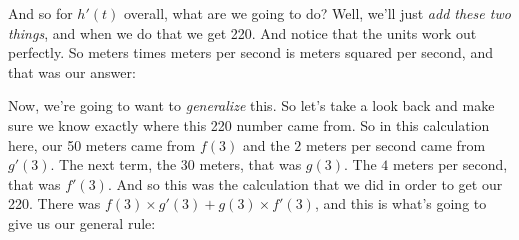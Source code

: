 \documentclass[pdftex, brazil, 12pt, twoside]{article}
\begin{document}
And so for $h'(t)$ overall, what are we going to do?
Well, we'll just \emph{add these two things},
and when we do that we get 220.
And notice that the units work out perfectly.
So meters times meters per second
is meters squared per second, and that was our answer:

\begin{figure}[H]
  \begin{center}
  \end{center}
\end{figure}

Now, we're going to want to \emph{generalize} this.
So let's take a look back and make
sure we know exactly where this 220 number came from.
So in this calculation here, our 50 meters came from $f(3)$
and the $2$ meters per second came from $g'(3)$.
The next term, the 30 meters, that was $g(3)$.
The $4$ meters per second, that was $f'(3)$.
And so this was the calculation that we
did in order to get our 220.
There was $f(3) \times g'(3) + g(3) \times f'(3)$, and this is what's going
to give us our general rule:

\begin{figure}[H]
  \begin{center}
  \end{center}
\end{figure}
\end{document}
